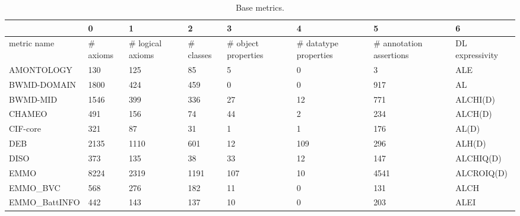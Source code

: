 \begin{table}
\centering
\caption{Base metrics.}
\label{tab:base-metrics}
\begin{tabular}{m{3.5cm}|m{1cm}m{1cm}m{1cm}m{1cm}m{1cm}m{1cm}m{1cm}}
\toprule
{} &         0 &                 1 &          2 &                    3 &                      4 &                        5 &                6 \\
\midrule
metric name             &  \# axioms &  \# logical axioms &  \# classes &  \# object properties &  \# datatype properties &  \# annotation assertions &  DL expressivity \\
AMONTOLOGY              &       130 &               125 &         85 &                    5 &                      0 &                        3 &              ALE \\
BWMD-DOMAIN             &      1800 &               424 &        459 &                    0 &                      0 &                      917 &               AL \\
BWMD-MID                &      1546 &               399 &        336 &                   27 &                     12 &                      771 &         ALCHI(D) \\
CHAMEO                  &       491 &               156 &         74 &                   44 &                      2 &                      234 &          ALCH(D) \\
CIF-core                &       321 &                87 &         31 &                    1 &                      1 &                      176 &            AL(D) \\
DEB                     &      2135 &              1110 &        601 &                   12 &                    109 &                      296 &           ALH(D) \\
DISO                    &       373 &               135 &         38 &                   33 &                     12 &                      147 &        ALCHIQ(D) \\
EMMO                    &      8224 &              2319 &       1191 &                  107 &                     10 &                     4541 &       ALCROIQ(D) \\
EMMO\_BVC                &       568 &               276 &        182 &                   11 &                      0 &                      131 &             ALCH \\
EMMO\_BattINFO           &       442 &               143 &        137 &                   10 &                      0 &                      203 &             ALEI \\

\end{tabular}
\end{table}
